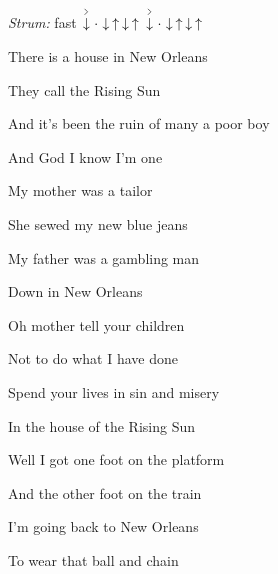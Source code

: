 \begin{song}


\begin{headerbox}
 \quad
\textit{Strum:} fast $\AccentDown\Miss\Down\Up\Down\Up\ \AccentDown\Miss\Down\Up\Down\Up$
\end{headerbox}

\begin{hchordbox}
\end{hchordbox}

\Large

\bigskip

    \par
{}    \par

\bigskip

There is a house in New Orleans  \par
They call the Rising Sun  \par
And it’s been the ruin of many a poor boy  \par
And God I know I’m one  \par

\bigskip

My mother was a tailor  \par
She sewed my new blue jeans  \par
My father was a gambling man \par
{}Down in New Orleans  \par

\bigskip

Oh mother tell your children  \par
Not to do what I have done  \par
{}Spend your lives in sin and misery \par
In the house of the Rising Sun  \par

\bigskip

Well I got one foot  on the platform  \par
And the other foot on the train  \par
I’m going back to New Orleans  \par
To wear that ball and chain  \par


\end{song}
